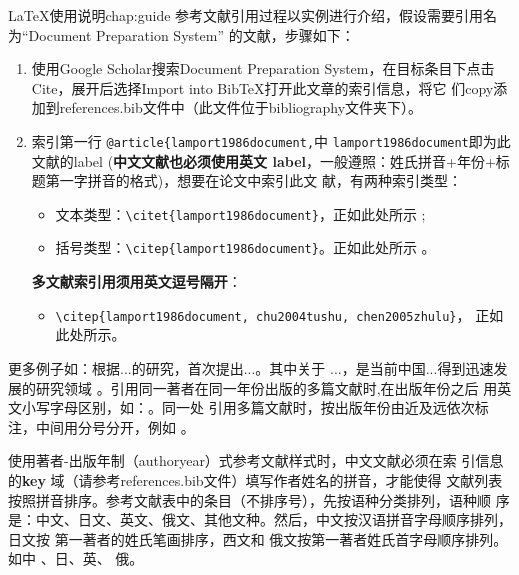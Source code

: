 \begin{cuzchapter}{\LaTeX{}使用说明}{chap:guide}
参考文献引用过程以实例进行介绍，假设需要引用名为``Document Preparation System''
的文献，步骤如下：
\begin{enumerate}
    \item 使用Google Scholar搜索Document Preparation System，在目标条目下点击
    Cite，展开后选择Import into BibTeX打开此文章的索引信息，将它
    们copy添加到references.bib文件中（此文件位于bibliography文件夹下）。
    \item 索引第一行 \verb|@article{lamport1986document,|中
    \verb|lamport1986document|即为此文献的label (\textbf{中文文献也必须使用英文
    label}，一般遵照：姓氏拼音+年份+标题第一字拼音的格式)，想要在论文中索引此文
    献，有两种索引类型：
    \begin{itemize}
        \item 文本类型：\verb|\citet{lamport1986document}|，正如此处所示
        \citet{lamport1986document}; 
        \item 括号类型：\verb|\citep{lamport1986document}|。正如此处所示
        \citep{lamport1986document}。
    \end{itemize}
    \textbf{多文献索引用须用英文逗号隔开}：
    \begin{itemize}
        \item \verb|\citep{lamport1986document, chu2004tushu, chen2005zhulu}|，
        正如此处所示\citep{lamport1986document, chu2004tushu, chen2005zhulu}。
    \end{itemize}
\end{enumerate}

更多例子如：\citet{walls2013drought}根据...的研究，首次提出...。其中关于
...\citep{walls2013drought}，是当前中国...得到迅速发展的研究领域
\citep{chen1980zhongguo}。引用同一著者在同一年份出版的多篇文献时,在出版年份之后
用英文小写字母区别，如：\citep{yuan2012lana, yuan2012lanb, yuan2012lanc}。同一处
引用多篇文献时，按出版年份由近及远依次标注，中间用分号分开，例如
\citep{chen1980zhongguo, stamerjohanns2009mathml, hls2012jinji, niu2013zonghe}。

使用著者-出版年制（authoryear）式参考文献样式时，中文文献必须在索
引信息的\textbf{key} 域（请参考references.bib文件）填写作者姓名的拼音，才能使得
文献列表按照拼音排序。参考文献表中的条目（不排序号），先按语种分类排列，语种顺
序是：中文、日文、英文、俄文、其他文种。然后，中文按汉语拼音字母顺序排列，日文按
第一著者的姓氏笔画排序，西文和 俄文按第一著者姓氏首字母顺序排列。如中
\citep{niu2013zonghe}、日\citep{Bohan1928}、英\citep{stamerjohanns2009mathml}、
俄\citep{Dubrovin1906}。


\end{cuzchapter}
